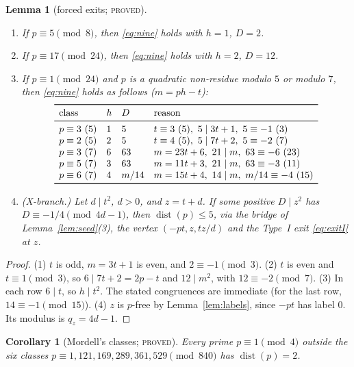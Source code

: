 \documentclass[11pt,reqno]{amsart}
\newtheorem{lemma}[theorem]{Lemma}
\newtheorem{corollary}[theorem]{Corollary}
\theoremstyle{definition}
\newcommand{\dist}{\operatorname{dist}}
\newcommand{\status}[1]{\textsc{#1}}
\begin{document}
\begin{lemma}[forced exits; \status{proved}]\label{lem:forced}
\leavevmode
\begin{enumerate}
\item If $p\equiv5\pmod8$, then \eqref{eq:nine} holds with $h=1$, $D=2$.
\item If $p\equiv17\pmod{24}$, then \eqref{eq:nine} holds with $h=2$, $D=12$.
\item If $p\equiv1\pmod{24}$ and $p$ is a quadratic non-residue modulo $5$
or modulo $7$, then \eqref{eq:nine} holds as follows ($m=ph-t$):
\[
\begin{array}{llll}
\toprule
\text{class}&h&D&\text{reason}\\\midrule
p\equiv3\ (5)&1&5&t\equiv3\ (5),\ 5\mid3t+1,\ 5\equiv-1\ (3)\\
p\equiv2\ (5)&2&5&t\equiv4\ (5),\ 5\mid7t+2,\ 5\equiv-2\ (7)\\
p\equiv3\ (7)&6&63&m=23t+6,\ 21\mid m,\ 63\equiv-6\ (23)\\
p\equiv5\ (7)&3&63&m=11t+3,\ 21\mid m,\ 63\equiv-3\ (11)\\
p\equiv6\ (7)&4&m/14&m=15t+4,\ 14\mid m,\ m/14\equiv-4\ (15)\\\bottomrule
\end{array}
\]
\item \emph{(X-branch.)}  Let $d\mid t^2$, $d>0$, and $z=t+d$.  If some
positive $D\mid z^2$ has $D\equiv-1/4\pmod{4d-1}$, then $\dist(p)\le5$, via
the bridge of Lemma~\ref{lem:seed}(3), the vertex $(-pt,z,tz/d)$ and the
Type~I exit \eqref{eq:exitI} at $z$.
\end{enumerate}
\end{lemma}

\begin{proof}
(1) $t$ is odd, $m=3t+1$ is even, and $2\equiv-1\pmod3$.  (2) $t$ is even and
$t\equiv1\pmod3$, so $6\mid7t+2=2p-t$ and $12\mid m^2$, with
$12\equiv-2\pmod7$.  (3) In each row $6\mid t$, so $h\mid t^2$.  The stated
congruences are immediate (for the last row, $14\equiv-1\pmod{15}$).  (4)
$z$ is $p$-free by Lemma~\ref{lem:labels}, since $-pt$ has label $0$.  Its
modulus is $q_z=4d-1$.
\end{proof}

\begin{corollary}[Mordell's classes; \status{proved}]\label{cor:mordell}
Every prime $p\equiv1\pmod4$ outside the six classes
$p\equiv1,121,169,289,361,529\pmod{840}$ has $\dist(p)=2$.
\end{corollary}
\end{document}
